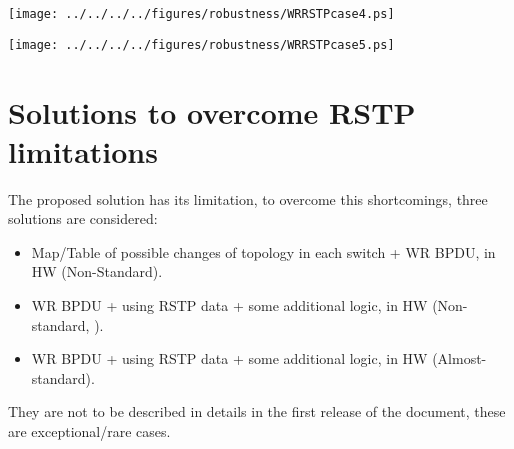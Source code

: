 \begin{center}
	\texttt{[image: ../../../../figures/robustness/WRRSTPcase4.ps]}
	\label{fig:WRRSTPcase4}
\end{center}

\begin{center}
	\texttt{[image: ../../../../figures/robustness/WRRSTPcase5.ps]}
	\label{fig:WRRSTPcase5}
\end{center}

\section{Solutions to overcome RSTP limitations}
The proposed solution has its limitation, to overcome this shortcomings, three
solutions are considered:
\begin{itemize}
  \item Map/Table of possible changes of topology in each
switch + WR BPDU, in HW (Non-Standard). 
  \item WR BPDU + using RSTP data + some additional logic, in HW (Non-standard,
).
  \item WR BPDU + using RSTP data + some additional logic, in HW
(Almost-standard).
\end{itemize}
They are not to be described in details in the first release of the document,
these are exceptional/rare cases.
